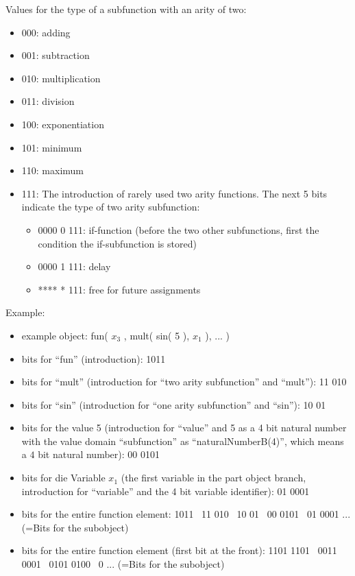 \bigskip\noindent
Values for the type of a subfunction with an arity of two:
\begin{itemize}
 \item 000: adding
 \item 001: subtraction
 \item 010: multiplication
 \item 011: division
 \item 100: exponentiation
 \item 101: minimum
 \item 110: maximum
 \item 111: The introduction of rarely used two arity functions. The next 5 bits indicate the type of two arity subfunction:
 \begin{itemize}
 \item 0000 0 111: if-function (before the two other subfunctions, first the condition the if-subfunction is stored)
 \item 0000 1 111: delay
 \item **** * 111: free for future assignments
 \end{itemize}
\end{itemize}

\bigskip\noindent
Example:
\begin{itemize}
 \item example object: fun( $x_3$ , mult( sin( 5 ), $x_1$ ), ... )
 \item bits for ``fun'' (introduction): 1011
 \item bits for ``mult'' (introduction for ``two arity subfunction'' and ``mult''): 11 010
 \item bits for ``sin'' (introduction for ``one arity subfunction'' and ``sin''): 10 01
 \item bits for the value 5 (introduction for ``value'' and 5 as a 4 bit natural number with the value domain ``subfunction'' as ``naturalNumberB(4)'', which means a $4$ bit natural number): 00 0101
 \item bits for die Variable $x_1$ (the first variable in the part object branch, introduction for ``variable'' and the 4 bit variable identifier): 01 0001
 \item bits for the entire function element: 1011 \ 11 010 \ 10 01 \ 00 0101 \ 01 0001 ...  (=Bits for the subobject)
 \item bits for the entire function element (first bit at the front): 1101 1101 \ 0011 0001 \ 0101 0100 \ 0 ...  (=Bits for the subobject)
\end{itemize}

